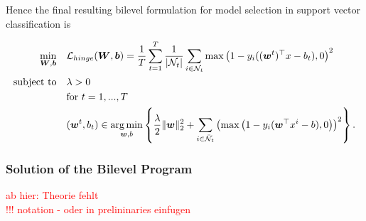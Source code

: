 
Hence the final resulting bilevel formulation for model selection in support vector classification is 

%

\begin{align}
\begin{split}
	\min_{\bm{W},\bm{b}} \quad &  \mathcal{L}_{hinge}(\bm{W},\bm{b}) = \frac{1}{T}\sum_{t=1}^T\frac{1}{|\mathcal{N}_t|}\sum_{i \in \mathcal{N}_t}{\max\left(1-y_i((\bm{w}^t)^{\top}x-b_t),0\right)^2}\\
	\text{subject to} \quad & \lambda > 0 \\
	& \text{for } t = 1,...,T \\
	& (\bm{w}^t,b_t) \in \operatorname*{arg\,min}_{\bm{w},b}\left\{ \frac{\lambda}{2} \|\bm{w}\|^2_2+\sum_{i\in \bar{\mathcal{N}}_t}{\left(\max\left(1-y_i(\bm{w}^{\top}x^i-b),0\right)\right)^2}\right\}. \\
\end{split}
\label{model_2}
\end{align}


\subsubsection{Solution of the Bilevel Program}

\textcolor{red}{ab hier: Theorie fehlt\\
!!! notation - oder in prelininaries einfugen}


